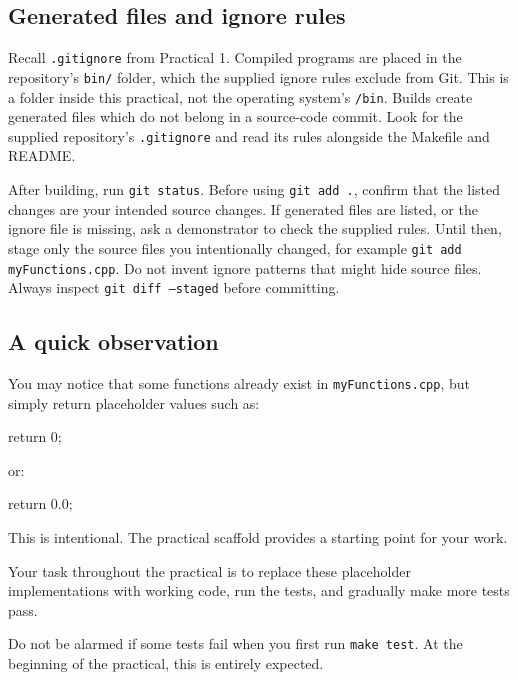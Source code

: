 \documentclass{csc2059practical}
\begin{document}
\subsection{Generated files and ignore rules}\label{sec:generated-files}
Recall \texttt{.gitignore} from Practical 1. Compiled programs are placed in the repository's \texttt{bin/} folder, which the supplied ignore rules exclude from Git. This is a folder inside this practical, not the operating system's \texttt{/bin}. Builds create generated files which do not belong in a source-code commit. Look for the supplied repository's \texttt{.gitignore} and read its rules alongside the Makefile and README.

After building, run \texttt{git status}. Before using \texttt{git add .}, confirm that the listed changes are your intended source changes. If generated files are listed, or the ignore file is missing, ask a demonstrator to check the supplied rules. Until then, stage only the source files you intentionally changed, for example \texttt{git add myFunctions.cpp}. Do not invent ignore patterns that might hide source files. Always inspect \texttt{git diff --staged} before committing.

\subsection{A quick observation}

\begin{importantnote}
You may notice that some functions already exist in \texttt{myFunctions.cpp}, but simply return placeholder values such as:

\begin{cppcode}
return 0;
\end{cppcode}

or:

\begin{cppcode}
return 0.0;
\end{cppcode}

This is intentional. The practical scaffold provides a starting point for your work.

Your task throughout the practical is to replace these placeholder implementations with working code, run the tests, and gradually make more tests pass.
\end{importantnote}

\begin{tipbox}
Do not be alarmed if some tests fail when you first run \texttt{make test}. At the beginning of the practical, this is entirely expected.
\end{tipbox}
\end{document}

